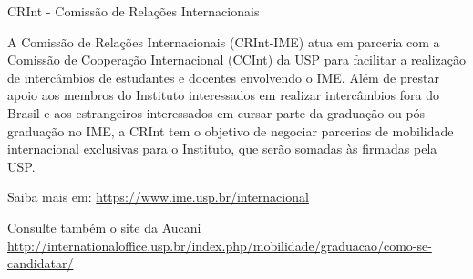 \begin{secao}{CRInt - Comissão de Relações Internacionais}

A Comissão de Relações Internacionais (CRInt-IME) atua em parceria com a Comissão
de Cooperação Internacional (CCInt) da USP para facilitar a realização de
intercâmbios de estudantes e docentes envolvendo o IME. Além de prestar apoio aos
membros do Instituto interessados em realizar intercâmbios fora do Brasil e aos
estrangeiros interessados em cursar parte da graduação ou pós-graduação no IME,
a CRInt tem o objetivo de negociar parcerias de mobilidade internacional exclusivas
para o Instituto, que serão somadas às firmadas pela USP.

Saiba mais em: \url{https://www.ime.usp.br/internacional}

Consulte também o site da Aucani \url{http://internationaloffice.usp.br/index.php/mobilidade/graduacao/como-se-candidatar/}

\end{secao}
